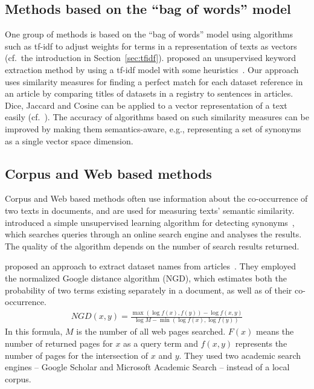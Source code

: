 \documentclass{IOS-Book-Article}
\begin{document}
\subsection{Methods based on the “bag of words” model}
One group of methods is based on the “bag of words” model using algorithms such as tf-idf to adjust weights for terms in a representation of texts as vectors (cf.\ the introduction in Section~\ref{sec:tfidf}).
\citeauthor{Lee2008} proposed an unsupervised keyword extraction method by using a tf-idf model with some heuristics~\cite{Lee2008}.
Our approach uses similarity measures for finding a perfect match for each dataset reference in an article by comparing titles of datasets in a registry to sentences in articles.
Dice, Jaccard and Cosine can be applied to a vector representation of a text easily (cf.~\citet{ChristopherD1999}).
The accuracy of algorithms based on such similarity measures can be improved by making them semantics-aware, e.g., representing a set of synonyms as a single vector space dimension.

\subsection{Corpus and Web based methods}
Corpus and Web based methods often use information about the co-occurrence of two texts in documents, and are used for measuring texts' semantic similarity.
\citeauthor{Turney2001} introduced a simple unsupervised learning algorithm for detecting synonyms~\cite{Turney2001}, which searches queries through an online search engine and analyses the results.
The quality of the algorithm depends on the number of search results returned.  

\citeauthor{sighal2013} proposed an approach to extract dataset names from articles~\cite{sighal2013}.
They employed the normalized Google distance algorithm (NGD), which estimates both the probability of two terms existing separately in a document, as well as of their co-occurrence. 
\begin{align*}
	\mathit{NGD}(x,y)=\frac{\max(\log f(x),f(y))-\log f(x,y)}{\log M -\min(\log f(x),\log f(y))}
\end{align*}
In this formula, $M$ is the number of all web pages searched.
$F(x)$ means the number of returned pages for $x$ as a query term and $f(x,y)$ represents the number of pages for the intersection of $x$ and $y$. 
They used two academic search engines -- Google Scholar and Microsoft Academic Search -- instead of a local corpus.
\end{document}
